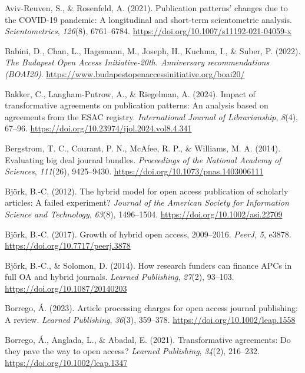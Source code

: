 \documentclass[a4paper,man,floatsintext,longtable,noextraspace,12pt]{apa6}
\newlength{\cslhangindent}
\newenvironment{CSLReferences}[2] %
  {\begin{list}{}{%
   \setlength{\itemindent}{0pt}
   \setlength{\leftmargin}{0pt}
   \setlength{\parsep}{0pt}
   \ifodd #1
    \setlength{\leftmargin}{\cslhangindent}
    \setlength{\itemindent}{-1\cslhangindent}
   \fi
   \setlength{\itemsep}{#2\baselineskip}}}
  {\end{list}}
\begin{document}
\label{refs}
\begin{CSLReferences}{1}{0}
Aviv-Reuven, S., \& Rosenfeld, A. (2021). Publication patterns' changes
due to the COVID-19 pandemic: A longitudinal and short-term
scientometric analysis. \emph{Scientometrics}, \emph{126}(8),
6761--6784. \url{https://doi.org/10.1007/s11192-021-04059-x}

Babini, D., Chan, L., Hagemann, M., Joseph, H., Kuchma, I., \& Suber, P.
(2022). \emph{{The Budapest Open Access Initiative-20th. Anniversary
recommendations (BOAI20)}}.
\url{https://www.budapestopenaccessinitiative.org/boai20/}

Bakker, C., Langham-Putrow, A., \& Riegelman, A. (2024). Impact of
transformative agreements on publication patterns: An analysis based on
agreements from the ESAC registry. \emph{International Journal of
Librarianship}, \emph{8}(4), 67--96.
\url{https://doi.org/10.23974/ijol.2024.vol8.4.341}

Bergstrom, T. C., Courant, P. N., McAfee, R. P., \& Williams, M. A.
(2014). Evaluating big deal journal bundles. \emph{Proceedings of the
National Academy of Sciences}, \emph{111}(26), 9425--9430.
\url{https://doi.org/10.1073/pnas.1403006111}

Björk, B.-C. (2012). The hybrid model for open access publication of
scholarly articles: A failed experiment? \emph{Journal of the American
Society for Information Science and Technology}, \emph{63}(8),
1496--1504. \url{https://doi.org/10.1002/asi.22709}

Björk, B.-C. (2017). Growth of hybrid open access, 2009--2016.
\emph{PeerJ}, \emph{5}, e3878. \url{https://doi.org/10.7717/peerj.3878}

Björk, B.-C., \& Solomon, D. (2014). How research funders can finance
APCs in full OA and hybrid journals. \emph{Learned Publishing},
\emph{27}(2), 93--103. \url{https://doi.org/10.1087/20140203}

Borrego, Á. (2023). Article processing charges for open access journal
publishing: A review. \emph{Learned Publishing}, \emph{36}(3), 359--378.
\url{https://doi.org/10.1002/leap.1558}

Borrego, Á., Anglada, L., \& Abadal, E. (2021). Transformative
agreements: Do they pave the way to open access? \emph{Learned
Publishing}, \emph{34}(2), 216--232.
\url{https://doi.org/10.1002/leap.1347}


\end{CSLReferences}
\end{document}
